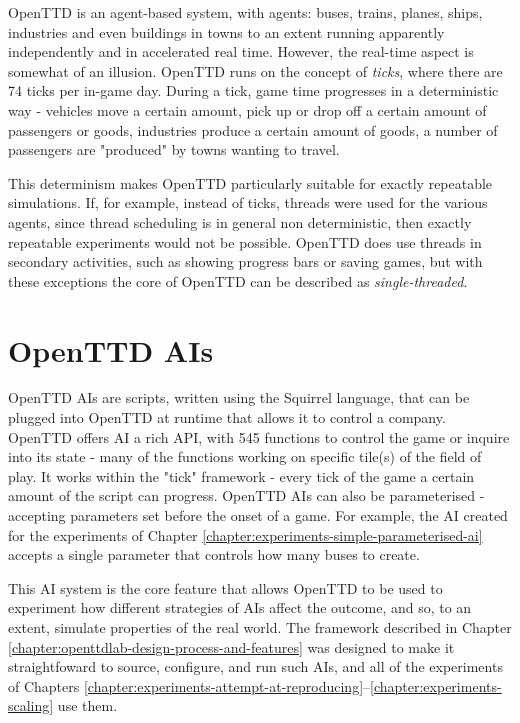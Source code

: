 \documentclass[logo,msc,dsti]{style/infthesis}    %
\begin{document}
{OpenTTD is an agent-based system, with agents: buses, trains, planes, ships, industries and even buildings in towns to an extent running apparently independently and in accelerated real time. However, the real-time aspect is somewhat of an illusion. OpenTTD runs on the concept of \emph{ticks}, where there are 74 ticks per in-game day. During a tick, game time progresses in a deterministic way - vehicles move a certain amount, pick up or drop off a certain amount of passengers or goods, industries produce a certain amount of goods, a number of passengers are "produced" by towns wanting to travel.

This determinism makes OpenTTD particularly suitable for exactly repeatable simulations. If, for example, instead of ticks, threads were used for the various agents, since thread scheduling is in general non deterministic, then exactly repeatable experiments would not be possible. OpenTTD does use threads in secondary activities, such as showing progress bars or saving games, but with these exceptions the core of OpenTTD can be described as \emph{single-threaded}.

\section{OpenTTD AIs}

OpenTTD AIs are scripts, written using the Squirrel language, that can be plugged into OpenTTD at runtime that allows it to control a company. OpenTTD offers AI a rich API, with 545 functions to control the game or inquire into its state \cite{OpenTTDAIAPIDocs} - many of the functions working on specific tile(s) of the field of play. It works within the "tick" framework - every tick of the game a certain amount of the script can progress. OpenTTD AIs can also be parameterised - accepting parameters set before the onset of a game. For example, the AI created for the experiments of Chapter \ref{chapter:experiments-simple-parameterised-ai} accepts a single parameter that controls how many buses to create.

This AI system is the core feature that allows OpenTTD to be used to experiment how different strategies of AIs affect the outcome, and so, to an extent, simulate properties of the real world. The framework described in Chapter \ref{chapter:openttdlab-design-process-and-features} was designed to make it straightfoward to source, configure, and run such AIs, and all of the experiments of Chapters \ref{chapter:experiments-attempt-at-reproducing}--\ref{chapter:experiments-scaling} use them.

}
\end{document}
